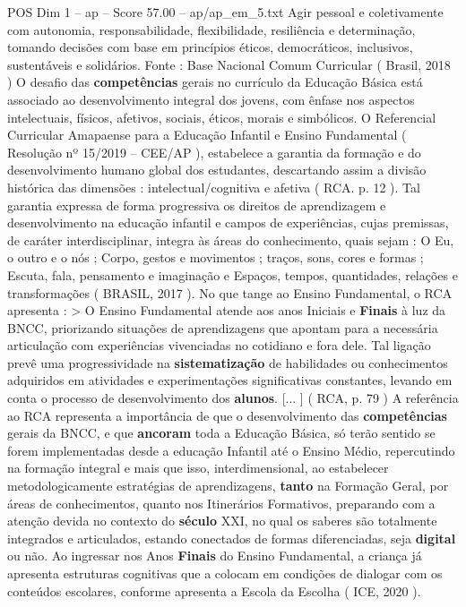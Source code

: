 \begin{textsample}{POS Dim 1 – ap – Score 57.00 – ap/ap\_em\_5.txt}
Agir pessoal e coletivamente com autonomia, responsabilidade, flexibilidade, resiliência e determinação, tomando decisões com base em princípios éticos, democráticos, inclusivos, sustentáveis e solidários.
Fonte : Base Nacional Comum Curricular ( Brasil, 2018 ) O desafio das \textbf{competências} gerais no currículo da Educação Básica está associado ao desenvolvimento integral dos jovens, com ênfase nos aspectos intelectuais, físicos, afetivos, sociais, éticos, morais e simbólicos.
O Referencial Curricular Amapaense para a Educação Infantil e Ensino Fundamental ( Resolução nº 15/2019 – CEE/AP ), estabelece a garantia da formação e do desenvolvimento humano global dos estudantes, descartando assim a divisão histórica das dimensões : intelectual/cognitiva e afetiva ( RCA. p. 12 ).
Tal garantia expressa de forma progressiva os direitos de aprendizagem e desenvolvimento na educação infantil e campos de experiências, cujas premissas, de caráter interdisciplinar, integra às áreas do conhecimento, quais sejam : O Eu, o outro e o nós ; Corpo, gestos e movimentos ; traços, sons, cores e formas ; Escuta, fala, pensamento e imaginação e Espaços, tempos, quantidades, relações e transformações ( BRASIL, 2017 ).
No que tange ao Ensino Fundamental, o RCA apresenta : > O Ensino Fundamental atende aos anos Iniciais e \textbf{Finais} à luz da BNCC, priorizando situações de aprendizagens que apontam para a necessária articulação com experiências vivenciadas no cotidiano e fora dele.
Tal ligação prevê uma progressividade na \textbf{sistematização} de habilidades ou conhecimentos adquiridos em atividades e experimentações significativas constantes, levando em conta o processo de desenvolvimento dos \textbf{alunos}. [... ] ( RCA, p. 79 ) A referência ao RCA representa a importância de que o desenvolvimento das \textbf{competências} gerais da BNCC, e que \textbf{ancoram} toda a Educação Básica, só terão sentido se forem implementadas desde a educação Infantil até o Ensino Médio, repercutindo na formação integral e mais que isso, interdimensional, ao estabelecer metodologicamente estratégias de aprendizagens, \textbf{tanto} na Formação Geral, por áreas de conhecimentos, quanto nos Itinerários Formativos, preparando com a atenção devida no contexto do \textbf{século} XXI, no qual os saberes são totalmente integrados e articulados, estando conectados de formas diferenciadas, seja \textbf{digital} ou não.
Ao ingressar nos Anos \textbf{Finais} do Ensino Fundamental, a criança já apresenta estruturas cognitivas que a colocam em condições de dialogar com os conteúdos escolares, conforme apresenta a Escola da Escolha ( ICE, 2020 ).

\end{textsample}
